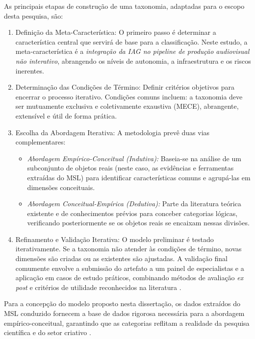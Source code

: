 As principais etapas de construção de uma taxonomia, adaptadas para o escopo desta pesquisa, são:

\begin{enumerate}
    \item Definição da Meta-Característica: O primeiro passo é determinar a característica central que servirá de base para a classificação. Neste estudo, a meta-característica é a \textit{integração da IAG no pipeline de produção audiovisual não interativo}, abrangendo os níveis de autonomia, a infraestrutura e os riscos inerentes.
    \item Determinação das Condições de Término: Definir critérios objetivos para encerrar o processo iterativo. Condições comuns incluem: a taxonomia deve ser mutuamente exclusiva e coletivamente exaustiva (MECE), abrangente, extensível e útil de forma prática.
    \item Escolha da Abordagem Iterativa: A metodologia prevê duas vias complementares:
    \begin{itemize}
        \item \textit{Abordagem Empírico-Conceitual (Indutiva):} Baseia-se na análise de um subconjunto de objetos reais (neste caso, as evidências e ferramentas extraídas do MSL) para identificar características comuns e agrupá-las em dimensões conceituais.
        \item \textit{Abordagem Conceitual-Empírica (Dedutiva):} Parte da literatura teórica existente e de conhecimentos prévios para conceber categorias lógicas, verificando posteriormente se os objetos reais se encaixam nessas divisões.
    \end{itemize}
    \item Refinamento e Validação Iterativa: O modelo preliminar é testado iterativamente. Se a taxonomia não atender às condições de término, novas dimensões são criadas ou as existentes são ajustadas. A validação final comumente envolve a submissão do artefato a um painel de especialistas e a aplicação em casos de estudo práticos, combinando métodos de avaliação \textit{ex post} e critérios de utilidade reconhecidos na literatura \citep{prat2015, szopinski2019}.
\end{enumerate}

Para a concepção do modelo proposto nesta dissertação, os dados extraídos do MSL conduzido fornecem a base de dados rigorosa necessária para a abordagem empírico-conceitual, garantindo que as categorias reflitam a realidade da pesquisa científica e do setor criativo \citep{RothAleo2026}.

